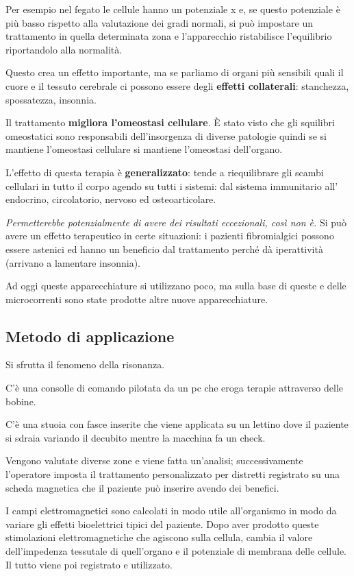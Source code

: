 Per esempio nel fegato le cellule hanno un potenziale x e, se questo
potenziale è più basso rispetto alla valutazione dei gradi normali, si
può impostare un trattamento in quella determinata zona e l'apparecchio
ristabilisce l'equilibrio riportandolo alla normalità.

Questo crea un effetto importante, ma se parliamo di organi più
sensibili quali il cuore e il tessuto cerebrale ci possono essere degli
\textbf{effetti collaterali}: stanchezza, spossatezza, insonnia.

Il trattamento \textbf{migliora l'omeostasi cellulare}. È stato visto
che gli squilibri omeostatici sono responsabili dell'insorgenza di
diverse patologie quindi se si mantiene l'omeostasi cellulare si
mantiene l'omeostasi dell'organo.

L'effetto di questa terapia è \textbf{generalizzato}: tende a
riequilibrare gli scambi cellulari in tutto il corpo agendo su tutti i
sistemi: dal sistema immunitario all' endocrino, circolatorio, nervoso
ed osteoarticolare.

\emph{Permetterebbe potenzialmente di avere dei risultati eccezionali,
così non è.} Si può avere un effetto terapeutico in certe situazioni: i
pazienti fibromialgici possono essere astenici ed hanno un beneficio dal
trattamento perché dà iperattività (arrivano a lamentare insonnia).

Ad oggi queste apparecchiature si utilizzano poco, ma sulla base di
queste e delle microcorrenti sono state prodotte altre nuove
apparecchiature.

\subsection{Metodo di applicazione}

Si sfrutta il fenomeno della risonanza.

C'è una consolle di comando pilotata da un pc che eroga terapie
attraverso delle bobine.

C'è una stuoia con fasce inserite che viene applicata su un lettino dove
il paziente si sdraia variando il decubito mentre la macchina fa un
check.

Vengono valutate diverse zone e viene fatta un'analisi; successivamente
l'operatore imposta il trattamento personalizzato per distretti
registrato su una scheda magnetica che il paziente può inserire avendo
dei benefici.

I campi elettromagnetici sono calcolati in modo utile all'organismo in
modo da variare gli effetti bioelettrici tipici del paziente. Dopo aver
prodotto queste stimolazioni elettromagnetiche che agiscono sulla
cellula, cambia il valore dell'impedenza tessutale di quell'organo e il
potenziale di membrana delle cellule. Il tutto viene poi registrato e
utilizzato.

